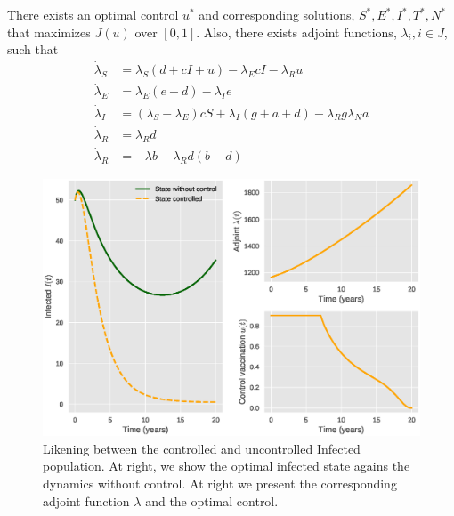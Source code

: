 \begin{theorem} 
    There exists an optimal control $u^{*}$ and corresponding solutions, \break
    $S^{*}, E^{*}, I^{*}, T^{*}, N^{*}$ that maximizes $J(u)$ over $[0, 1]$. 
    Also, there exists adjoint functions, $\lambda_{i}, i \in J$, such that
    \begin{align*}
         \dot{\lambda}_{S} &=
            \lambda_{S}\left(d + cI + u \right) - \lambda_{E}cI - 
            \lambda_{R}u   \\
        \dot{\lambda}_{E} &=
            \lambda_{E}(e + d) - \lambda_{I}e  \\
        \dot{\lambda}_{I} &=
            (\lambda_{S} - \lambda_{E})cS + \lambda_{I}(g + a +d) - \lambda_{R}g
            \lambda_{N}a\\
        \dot{\lambda}_{R} &=    \lambda_{R}d  \\
        \dot{\lambda}_{R} &=
            - \lambda b - \lambda_{R}d  (b - d)
    \end{align*}
\end{theorem}

\begin{figure}[tbh!]
\centering
	\includegraphics[width=0.7\linewidth]{./Figures/epidemics_lenhart_lab7}
	\caption{Likening between the controlled and uncontrolled Infected 
	 population.  At right, we show the optimal infected state agains the 
	 dynamics without 
	 control. At right we present the corresponding adjoint function $\lambda$ 
	 and the optimal control.}
\label{fig:epidemicslenhartlab7}
\end{figure}
